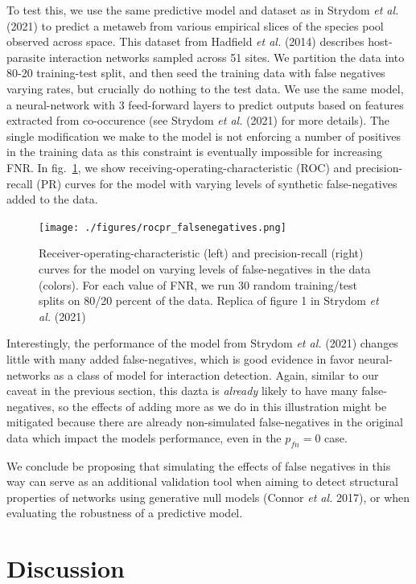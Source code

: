 \documentclass[10pt,oneside]{article}
\begin{document}
To test this, we use the same predictive model and dataset as in Strydom
\emph{et al.} (2021) to predict a metaweb from various empirical slices
of the species pool observed across space. This dataset from Hadfield
\emph{et al.} (2014) describes host-parasite interaction networks
sampled across 51 sites. We partition the data into 80-20 training-test
split, and then seed the training data with false negatives varying
rates, but crucially do nothing to the test data. We use the same model,
a neural-network with 3 feed-forward layers to predict outputs based on
features extracted from co-occurence (see Strydom \emph{et al.} (2021)
for more details). The single modification we make to the model is not
enforcing a number of positives in the training data as this constraint
is eventually impossible for increasing FNR. In fig.~\ref{fig:rocpr}, we
show receiving-operating-characteristic (ROC) and precision-recall (PR)
curves for the model with varying levels of synthetic false-negatives
added to the data.

\begin{figure}
\hypertarget{fig:rocpr}{%
\centering
\texttt{[image: ./figures/rocpr\_falsenegatives.png]}
\caption{Receiver-operating-characteristic (left) and precision-recall
(right) curves for the model on varying levels of false-negatives in the
data (colors). For each value of FNR, we run 30 random training/test
splits on 80/20 percent of the data. Replica of figure 1 in Strydom
\emph{et al.} (2021)}\label{fig:rocpr}
}
\end{figure}

Interestingly, the performance of the model from Strydom \emph{et al.}
(2021) changes little with many added false-negatives, which is good
evidence in favor neural-networks as a class of model for interaction
detection. Again, similar to our caveat in the previous section, this
dazta is \emph{already} likely to have many false-negatives, so the
effects of adding more as we do in this illustration might be mitigated
because there are already non-simulated false-negatives in the original
data which impact the models performance, even in the \(p_{fn} = 0\)
case.

We conclude be proposing that simulating the effects of false negatives
in this way can serve as an additional validation tool when aiming to
detect structural properties of networks using generative null models
(Connor \emph{et al.} 2017), or when evaluating the robustness of a
predictive model.

\hypertarget{discussion}{%
\section{Discussion}\label{discussion}}
\end{document}
